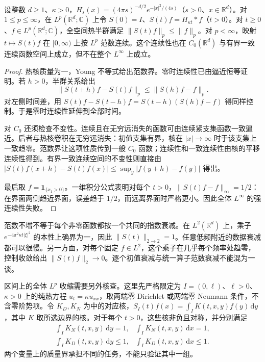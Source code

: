 \begin{proposition}[范数收缩与强连续性]\label{b2:prop:12-contraction}
设整数 \(d\geq1\)、\(\kappa>0\)，\(H_s(x)=(4\pi s)^{-d/2}e^{-|x|^2/(4s)}\)（\(s>0\)、\(x\in\mathbb R^d\)）。对 \(1\leq p\leq\infty\)，在 \(L^p(\mathbb R^d;\mathbb C)\) 上令 \(S(0)=I\)、\(S(t)f=H_{\kappa t}*f\)（\(t>0\)）。对 \(t\geq0\)、\(f\in L^p(\mathbb R^d;\mathbb C)\)，全空间热半群满足 \(\|S(t)f\|_p\leq\|f\|_p\)。对 \(p<\infty\)，映射 \(t\mapsto S(t)f\) 在 \([0,\infty)\) 上按 \(L^p\) 范数连续。这个连续性也在 \(C_0(\mathbb R^d)\) 与有界一致连续函数空间上成立，但不在整个 \(L^\infty\) 上成立。
\end{proposition}
\begin{proof}
热核质量为一，Young 不等式给出范数界。零时连续性已由逼近恒等证明。若 \(h>0\)，半群关系给出
\[
 \|S(t+h)f-S(t)f\|_p\leq\|S(h)f-f\|_p.
\]
对左侧时间差，用 \(S(t)f-S(t-h)f=S(t-h)(S(h)f-f)\) 得同样控制。于是零时连续性延伸到全部时间。

对 \(C_0\) 还须检查不变性。连续且在无穷远消失的函数可由连续紧支集函数一致逼近。后者与热核卷积在无穷远消失：初值支集有界，核在 \(|x|\to\infty\) 时于该支集上一致趋零。范数界让这项性质传到一般 \(C_0\) 函数；连续性和一致连续性由核的平移连续性得到。有界一致连续空间的不变性则直接由 \(|S(t)f(x+h)-S(t)f(x)|\leq\sup_y|f(y+h)-f(y)|\) 得出。

最后取 \(f=\mathbf1_{\{x_1>0\}}\)。一维积分公式表明对每个 \(t>0\)，\(\|S(t)f-f\|_\infty=1/2\)：在界面两侧趋近界面，误差趋于 \(1/2\)，而远离界面时严格更小。因此全体 \(L^\infty\) 的强连续性失败。
\end{proof}

范数不增不等于每个非零函数都按一个共同的指数衰减。在 \(L^2(\mathbb R^d)\) 上，乘子 \(e^{-4\pi^2\kappa t|\xi|^2}\) 的本性上确界为一，因此 \(\|S(t)\|_{2\to2}=1\)。任意低频附近的数据衰减都可以很慢。另一方面，对每个固定 \(f\in L^2\)，这个乘子在几乎每个频率处趋零，控制收敛给出 \(\|S(t)f\|_2\to0\)。逐个初值衰减与统一算子范数衰减不能混为一谈。

\ProseParagraphBreak

区间上的全体 \(L^p\) 收缩需要另外核查。这里先严格限定为 \(I=(0,\ell)\)、\(\ell>0\)、\(\kappa>0\) 上的纯热方程 \(u_t=\kappa u_{xx}\)，取两端零 Dirichlet 或两端零 Neumann 条件，不含零阶势项。令 \(K_D,K_N\) 为中的对应核，\(S_I(t)f(x)=\int_I K(t,x,y)f(y)\,\mathrm{d}y\)，其中 \(K\) 取所选边界的核。对于每个 \(t>0\)，这些核非负且对称，并分别满足
\[
 \begin{array}{ll}
 \displaystyle\int_I K_N(t,x,y)\,\mathrm{d}y=1,
 &\displaystyle\int_I K_N(t,x,y)\,\mathrm{d}x=1,\\[4pt]
 \displaystyle\int_I K_D(t,x,y)\,\mathrm{d}y\leq1,
 &\displaystyle\int_I K_D(t,x,y)\,\mathrm{d}x\leq1.
 \end{array}
\]
两个变量上的质量界承担不同的任务，不能只验证其中一组。

